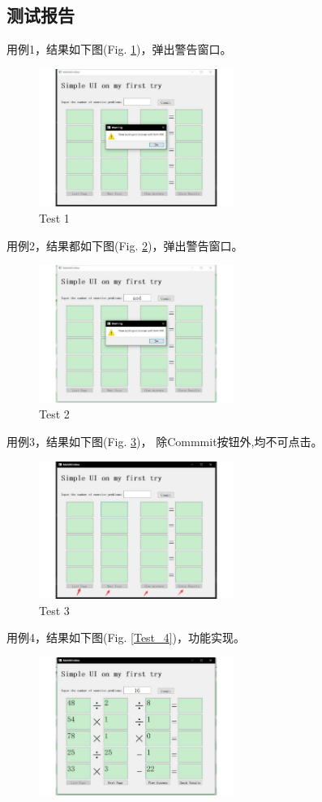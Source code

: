 \documentclass[10pt,journal,compsoc,fleqn]{IEEEtran}
\begin{document}
\begin{CJK}{UTF8}{song}
\section{测试报告}
用例1，结果如下图(Fig. \ref{Test_1})，弹出警告窗口。
\begin{figure}[H]
  \centering
  \includegraphics[width=2.5in]{./figures/1.pdf}
  \caption{Test 1}
  \label{Test_1}
\end{figure}
用例2，结果都如下图(Fig. \ref{Test_2})，弹出警告窗口。
\begin{figure}[H]
  \centering
  \includegraphics[width=2.5in]{./figures/2.pdf}
  \caption{Test 2}
  \label{Test_2}
\end{figure}
用例3，结果如下图(Fig. \ref{Test_3})， 除Commmit按钮外,均不可点击。
\begin{figure}[H]
  \centering
  \includegraphics[width=2.5in]{./figures/4.pdf}
  \caption{Test 3}
  \label{Test_3}
\end{figure}
用例4，结果如下图(Fig. \ref{Test_4})，功能实现。
\begin{figure}[H]
  \centering
  \includegraphics[width=2.5in]{./figures/3.pdf}

\end{figure}
\end{CJK}
\end{document}

